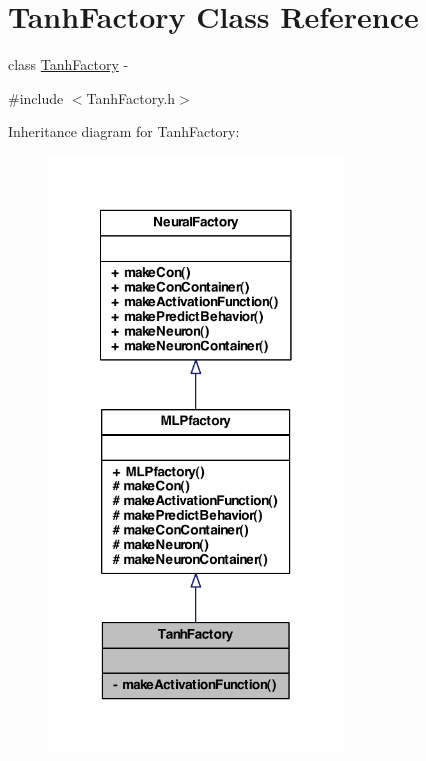 \hypertarget{class_tanh_factory}{
\section{TanhFactory Class Reference}
\label{class_tanh_factory}
}


class \hyperlink{class_tanh_factory}{TanhFactory} -\/  




{\ttfamily \#include $<$TanhFactory.h$>$}



Inheritance diagram for TanhFactory:
\nopagebreak
\begin{figure}[H]
\begin{center}
\leavevmode
\includegraphics[width=222pt]{class_tanh_factory__inherit__graph}
\end{center}
\end{figure}


